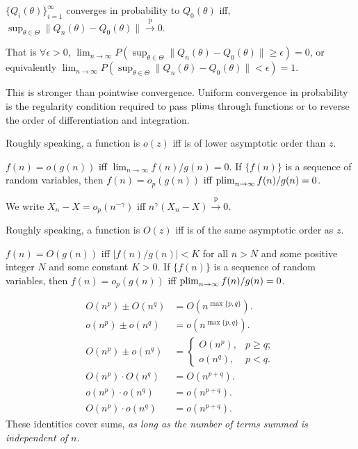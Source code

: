 \documentclass[8pt,letterpaper, landscape]{extarticle} %
\begin{document}
\begin{multicols}{3}
\begin{description}
 $ \{ Q_i(\theta) \}_{i=1}^{\infty} $ converges in probability to $ Q_0(\theta) $ iff, $ \sup_{\theta \in \Theta} \lVert Q_n(\theta) - Q_0(\theta) \rVert \xrightarrow{\text{p}} 0 $.

That is $ \forall \epsilon > 0 $, $ \lim_{n \to \infty} P( \sup_{\theta \in \Theta} \lVert Q_n(\theta) - Q_0(\theta) \rVert \geq \epsilon ) =0 $, or equivalently $ \lim_{n \to \infty} P( \sup_{\theta \in \Theta} \lVert Q_n(\theta) - Q_0(\theta) \rVert < \epsilon ) = 1 $.

This is stronger than pointwise convergence. Uniform convergence in probability is the regularity condition required to pass $ \operatorname*{plim} $s through functions or to reverse the order of differentiation and integration.

 Roughly speaking, a function is $ o(z) $ iff is of lower asymptotic order than $ z $.

$ f(n) = o(g(n)) $ iff $ \lim_{n \to \infty} f(n) / g(n) = 0 $. If $ \{ f(n) \} $ is a sequence of random variables, then $ f(n) = o_p (g(n)) $ iff $ \operatorname*{plim}_{n \to \infty} f(n) / g(n) = 0 $.

We write $ X_n - X = o_p (n^{- \gamma}) $ iff $ n^{\gamma}(X_n - X) \xrightarrow{\text{p}} 0 $.

 Roughly speaking, a function is $ O(z) $ iff is of the same asymptotic order as $ z $.

$ f(n) = O(g(n)) $ iff $ | f(n) / g(n) | < K $ for all $ n > N $ and some positive integer $ N $ and some constant $ K >0 $. If $ \{ f(n) \} $ is a sequence of random variables, then $ f(n) = o_p (g(n)) $ iff $ \operatorname*{plim}_{n \to \infty} f(n) / g(n) = 0 $.

\begin{align*}
O(n^p) \pm O(n^q) &= O(n^{\max \{ p,q \}}). \\
o(n^p) \pm o(n^q) &= o(n^{\max \{ p,q \}}). \\
O(n^p) \pm o(n^q) &= \begin{cases} O(n^p), & p \geq q; \\ o(n^q), & p < q. \end{cases} \\
O(n^p) \cdot O(n^q) &= O(n^{p+q}). \\
o(n^p) \cdot o(n^q) &= o(n^{p+q}). \\
O(n^p) \cdot o(n^q) &= o(n^{p+q}).
\end{align*}
These identities cover sums, \textit{as long as the number of terms summed is independent of $ n $}.


\end{description}
\end{multicols}
\end{document}
